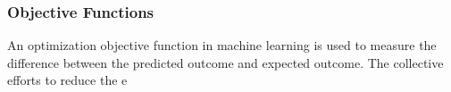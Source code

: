 \subsubsection{Objective Functions}
An optimization objective function in machine learning is used to measure the difference between the predicted outcome and expected outcome. The collective efforts to reduce the e